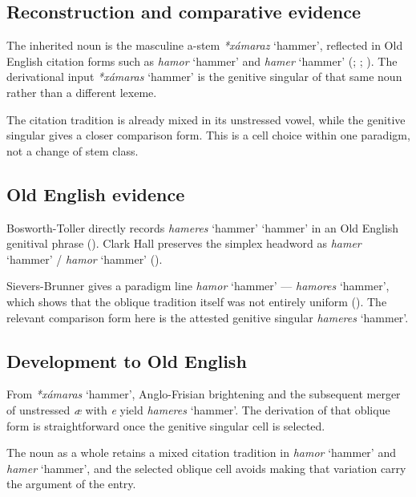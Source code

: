 \documentclass[
  british,
  a4paper,
  openany]{book}
\providecommand{\Recon}[1]{\emph{*#1}}
{\catcode`→=\active \global\def→{\ensuremath{\rightarrow}}}
\providecommand{\Recon}[1]{\emph{*#1}}
{\catcode`→=\active \global\def→{\ensuremath{\rightarrow}}}
\begin{document}
\subsection{Reconstruction and comparative
evidence}\label{reconstruction-and-comparative-evidence-114}

The inherited noun is the masculine a-stem {\Recon{xámaraz} `hammer'},
reflected in Old English citation forms such as {\emph{hamor}} `hammer'
and {\emph{hamer}} `hammer' (; ;
). The derivational
input {\Recon{xámaras} `hammer'} is the genitive singular of that same
noun rather than a different lexeme.

The citation tradition is already mixed in its unstressed vowel, while
the genitive singular gives a closer comparison form. This is a cell
choice within one paradigm, not a change of stem class.

\subsection{Old English evidence}\label{old-english-evidence-114}

Bosworth-Toller directly records {\emph{hameres}} `hammer' `hammer' in
an Old English genitival phrase
(). Clark
Hall preserves the simplex headword as {\emph{hamer}} `hammer' /
{\emph{hamor}} `hammer' ().

Sievers-Brunner gives a paradigm line {\emph{hamor}} `hammer' ---
{\emph{hamores}} `hammer', which shows that the oblique tradition itself
was not entirely uniform (). The relevant comparison form here is the attested
genitive singular {\emph{hameres}} `hammer'.

\subsection{Development to Old
English}\label{development-to-old-english-114}

From {\Recon{xámaras} `hammer'}, Anglo-Frisian brightening and the
subsequent merger of unstressed \emph{æ} with \emph{e} yield
{\emph{hameres}} `hammer'. The derivation of that oblique form is
straightforward once the genitive singular cell is selected.

The noun as a whole retains a mixed citation tradition in {\emph{hamor}}
`hammer' and {\emph{hamer}} `hammer', and the selected oblique cell
avoids making that variation carry the argument of the entry.
\end{document}
